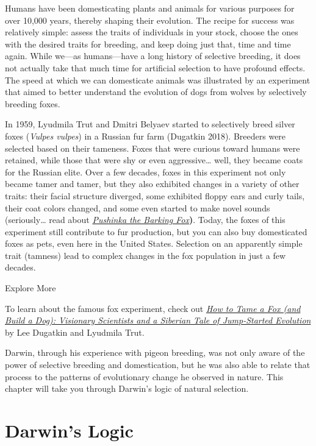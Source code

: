 \documentclass[
]{book}
\begin{document}
Humans have been domesticating plants and animals for various purposes for over 10,000 years, thereby shaping their evolution. The recipe for success was relatively simple: assess the traits of individuals in your stock, choose the ones with the desired traits for breeding, and keep doing just that, time and time again. While we---as humans---have a long history of selective breeding, it does not actually take that much time for artificial selection to have profound effects. The speed at which we can domesticate animals was illustrated by an experiment that aimed to better understand the evolution of dogs from wolves by selectively breeding foxes.

In 1959, Lyudmila Trut and Dmitri Belyaev started to selectively breed silver foxes (\emph{Vulpes vulpes}) in a Russian fur farm (Dugatkin 2018). Breeders were selected based on their tameness. Foxes that were curious toward humans were retained, while those that were shy or even aggressive\ldots{} well, they became coats for the Russian elite. Over a few decades, foxes in this experiment not only became tamer and tamer, but they also exhibited changes in a variety of other traits: their facial structure diverged, some exhibited floppy ears and curly tails, their coat colors changed, and some even started to make novel sounds (seriously\ldots{} read about \href{https://www.amazon.com/Pushinka-Barking-Fox-Unexpected-Friendship/dp/1943978468}{\emph{Pushinka the Barking Fox}}\textbf{)}. Today, the foxes of this experiment still contribute to fur production, but you can also buy domesticated foxes as pets, even here in the United States. Selection on an apparently simple trait (tamness) lead to complex changes in the fox population in just a few decades.

Explore More

To learn about the famous fox experiment, check out \href{https://www.amazon.com/How-Tame-Fox-Build-Dog/dp/022659971X}{\emph{How to Tame a Fox (and Build a Dog): Visionary Scientists and a Siberian Tale of Jump-Started Evolution}} by Lee Dugatkin and Lyudmila Trut.

Darwin, through his experience with pigeon breeding, was not only aware of the power of selective breeding and domestication, but he was also able to relate that process to the patterns of evolutionary change he observed in nature. This chapter will take you through Darwin's logic of natural selection.

\hypertarget{darwins-logic}{%
\section{Darwin's Logic}\label{darwins-logic}}
\end{document}

